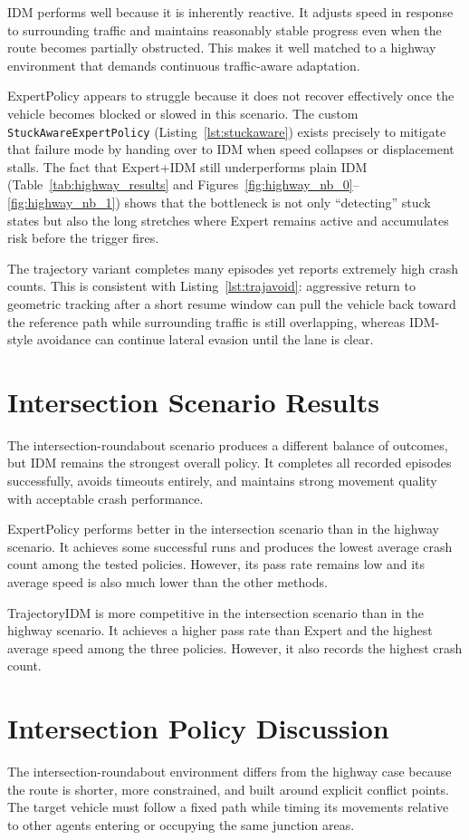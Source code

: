 \documentclass[12pt,a4paper]{report}
\begin{document}
IDM performs well because it is inherently reactive. It adjusts speed in response to surrounding traffic and maintains reasonably stable progress even when the route becomes partially obstructed. This makes it well matched to a highway environment that demands continuous traffic-aware adaptation.

ExpertPolicy appears to struggle because it does not recover effectively once the vehicle becomes blocked or slowed in this scenario. The custom \texttt{StuckAwareExpertPolicy} (Listing~\ref{lst:stuckaware}) exists precisely to mitigate that failure mode by handing over to IDM when speed collapses or displacement stalls. The fact that Expert+IDM still underperforms plain IDM (Table~\ref{tab:highway_results} and Figures~\ref{fig:highway_nb_0}--\ref{fig:highway_nb_1}) shows that the bottleneck is not only ``detecting'' stuck states but also the long stretches where Expert remains active and accumulates risk before the trigger fires.

The trajectory variant completes many episodes yet reports extremely high crash counts. This is consistent with Listing~\ref{lst:trajavoid}: aggressive return to geometric tracking after a short resume window can pull the vehicle back toward the reference path while surrounding traffic is still overlapping, whereas IDM-style avoidance can continue lateral evasion until the lane is clear.

\section{Intersection Scenario Results}
The intersection-roundabout scenario produces a different balance of outcomes, but IDM remains the strongest overall policy. It completes all recorded episodes successfully, avoids timeouts entirely, and maintains strong movement quality with acceptable crash performance.

ExpertPolicy performs better in the intersection scenario than in the highway scenario. It achieves some successful runs and produces the lowest average crash count among the tested policies. However, its pass rate remains low and its average speed is also much lower than the other methods.

TrajectoryIDM is more competitive in the intersection scenario than in the highway scenario. It achieves a higher pass rate than Expert and the highest average speed among the three policies. However, it also records the highest crash count.

\section{Intersection Policy Discussion}
The intersection-roundabout environment differs from the highway case because the route is shorter, more constrained, and built around explicit conflict points. The target vehicle must follow a fixed path while timing its movements relative to other agents entering or occupying the same junction areas.
\end{document}
